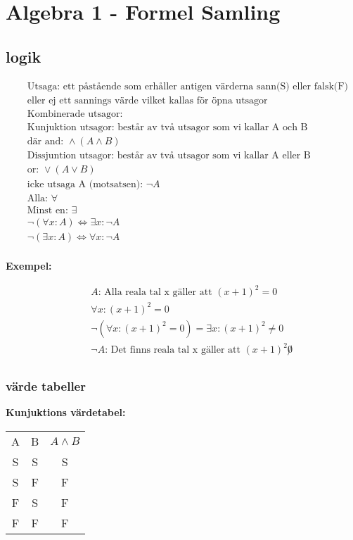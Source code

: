 \chapter{Algebra 1 - Formel Samling}

\newpage

\section{logik}
\begin{align*}
  &\quad \text{Utsaga: ett påstående som erhåller antigen värderna sann(S) eller falsk(F) vilket ge en stluten utsaga} \\
  &\quad \text{eller ej ett sannings värde vilket kallas för öpna utsagor} \\
  &\quad \text{Kombinerade utsagor:} \\
  &\quad \text{Kunjuktion utsagor: består av två utsagor som vi kallar A och B} \\
  &\quad \text{där and: } \land  (A \land B) \\
  &\quad \text{Dissjuntion utsagor: består av två utsagor som vi kallar A eller B} \\
  &\quad \text{or: } \lor  (A \lor B) \\
  &\quad \text{icke utsaga A (motsatsen): } \neg A \\
  &\quad \text{Alla: } \forall \\
  &\quad \text{Minst en: } \exists \\
  &\quad \neg(\forall x : A) \Leftrightarrow \exists x : \neg A \\
  &\quad \neg(\exists x : A) \Leftrightarrow \forall x : \neg A \\
\end{align*}

\textbf{Exempel:}\par
\begin{align*}
  &\quad A \text{: Alla reala tal x gäller att } (x+1)^2 = 0 \\
  &\quad \forall x : (x+1)^2 = 0 \\
  &\quad \neg(\forall x : (x+1)^2 = 0) = \exists x : (x+1)^2 \not = 0 \\
  &\quad \neg A \text{: Det finns reala tal x gäller att } (x+1)^2 \not 0 \\
\end{align*}



\subsection{värde tabeller}
\textbf{Kunjuktions värdetabel:}\par
\begin{center}
\begin{tabular}{ |c|c|c| } 
 \hline
 A  & B  & \(A \land B\) \\ 
 S  & S  & S          \\ 
 S  & F  & F          \\  
 F  & S  & F          \\ 
 F  & F  & F          \\ 
 \hline
\end{tabular}
\end{center}

